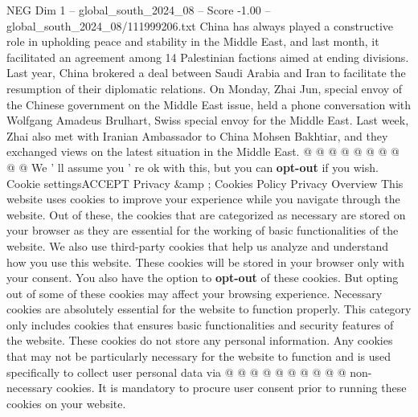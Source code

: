 \begin{textsample}{NEG Dim 1 – global\_south\_2024\_08 – Score -1.00 – global\_south\_2024\_08/111999206.txt}
China has always played a constructive role in upholding peace and stability in the Middle East, and last month, it facilitated an agreement among 14 Palestinian factions aimed at ending divisions.
Last year, China brokered a deal between Saudi Arabia and Iran to facilitate the resumption of their diplomatic relations.
On Monday, Zhai Jun, special envoy of the Chinese government on the Middle East issue, held a phone conversation with Wolfgang Amadeus Brulhart, Swiss special envoy for the Middle East.
Last week, Zhai also met with Iranian Ambassador to China Mohsen Bakhtiar, and they exchanged views on the latest situation in the Middle East. @ @ @ @ @ @ @ @ @ @ We ' ll assume you ' re ok with this, but you can \textbf{opt-out} if you wish.
Cookie settingsACCEPT Privacy \&amp ; Cookies Policy Privacy Overview This website uses cookies to improve your experience while you navigate through the website.
Out of these, the cookies that are categorized as necessary are stored on your browser as they are essential for the working of basic functionalities of the website.
We also use third-party cookies that help us analyze and understand how you use this website.
These cookies will be stored in your browser only with your consent.
You also have the option to \textbf{opt-out} of these cookies.
But opting out of some of these cookies may affect your browsing experience.
Necessary cookies are absolutely essential for the website to function properly.
This category only includes cookies that ensures basic functionalities and security features of the website.
These cookies do not store any personal information.
Any cookies that may not be particularly necessary for the website to function and is used specifically to collect user personal data via @ @ @ @ @ @ @ @ @ @ non-necessary cookies.
It is mandatory to procure user consent prior to running these cookies on your website.

\end{textsample}
